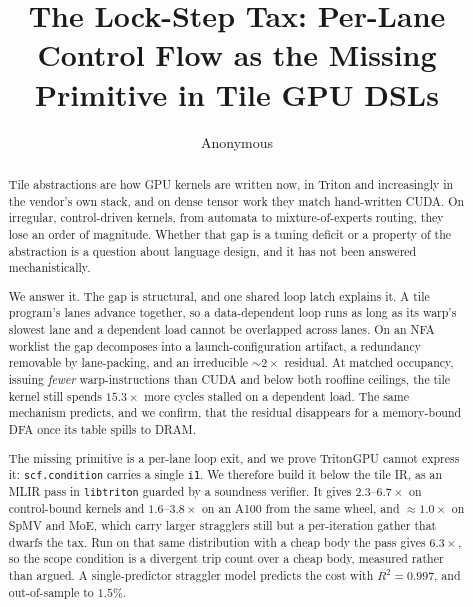\documentclass[sigplan,screen,review,anonymous]{acmart}
\begin{document}
\title{The Lock-Step Tax: Per-Lane Control Flow as the Missing Primitive in Tile GPU DSLs}
\author{Anonymous}
\renewcommand{\shortauthors}{Anonymous}

\begin{abstract}
Tile abstractions are how GPU kernels are written now, in Triton and increasingly in the
vendor's own stack, and on dense tensor work they match hand-written CUDA. On irregular,
control-driven kernels, from automata to mixture-of-experts routing, they lose an order of
magnitude. Whether that gap is a tuning
deficit or a property of the abstraction is a question about language design, and it has
not been answered mechanistically.

We answer it. The gap is structural, and one shared loop latch explains it. A tile
program's lanes advance together, so a data-dependent loop runs as long as its warp's
slowest lane and a dependent load cannot be overlapped across lanes. On an NFA worklist
the gap decomposes into a launch-configuration artifact, a redundancy removable by
lane-packing, and an irreducible ${\sim}2\times$ residual. At matched occupancy, issuing
\emph{fewer} warp-instructions than CUDA and below both roofline ceilings, the tile kernel
still spends $15.3\times$ more cycles stalled on a dependent load. The same mechanism
predicts, and we confirm, that the residual disappears for a memory-bound DFA once its
table spills to DRAM.

The missing primitive is a per-lane loop exit, and we prove TritonGPU cannot express it:
\texttt{scf.condition} carries a single \texttt{i1}. We therefore build it below the tile
IR, as an MLIR pass in \texttt{libtriton} guarded by a soundness verifier. It gives
$2.3$--$6.7\times$ on control-bound kernels and $1.6$--$3.8\times$ on an A100 from the same
wheel, and ${\approx}1.0\times$ on SpMV and MoE, which carry larger stragglers still but a
per-iteration gather that dwarfs the tax. Run on that same distribution with a cheap body
the pass gives $6.3\times$, so the scope condition is a divergent trip count over a cheap
body, measured rather than argued. A single-predictor straggler model predicts the cost with $R^2=0.997$, and
out-of-sample to $1.5\%$.
\end{abstract}
\end{document}
